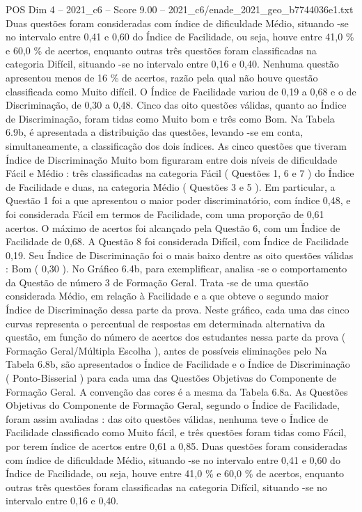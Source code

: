\begin{textsample}{POS Dim 4 – 2021\_c6 – Score 9.00 – 2021\_c6/enade\_2021\_geo\_b7744036e1.txt}
Duas questões foram consideradas com índice de dificuldade Médio, situando -se no intervalo entre 0,41 e 0,60 do Índice de Facilidade, ou seja, houve entre 41,0 \% e 60,0 \% de acertos, enquanto outras três questões foram classificadas na categoria Difícil, situando -se no intervalo entre 0,16 e 0,40.
Nenhuma questão apresentou menos de 16 \% de acertos, razão pela qual não houve questão classificada como Muito difícil.
O Índice de Facilidade variou de 0,19 a 0,68 e o de Discriminação, de 0,30 a 0,48.
Cinco das oito questões válidas, quanto ao Índice de Discriminação, foram tidas como Muito bom e três como Bom.
Na Tabela 6.9b, é apresentada a distribuição das questões, levando -se em conta, simultaneamente, a classificação dos dois índices.
As cinco questões que tiveram Índice de Discriminação Muito bom figuraram entre dois níveis de dificuldade Fácil e Médio : três classificadas na categoria Fácil ( Questões 1, 6 e 7 ) do Índice de Facilidade e duas, na categoria Médio ( Questões 3 e 5 ).
Em particular, a Questão 1 foi a que apresentou o maior poder discriminatório, com índice 0,48, e foi considerada Fácil em termos de Facilidade, com uma proporção de 0,61 acertos.
O máximo de acertos foi alcançado pela Questão 6, com um Índice de Facilidade de 0,68.
A Questão 8 foi considerada Difícil, com Índice de Facilidade 0,19.
Seu Índice de Discriminação foi o mais baixo dentre as oito questões válidas : Bom ( 0,30 ).
No Gráfico 6.4b, para exemplificar, analisa -se o comportamento da Questão de número 3 de Formação Geral.
Trata -se de uma questão considerada Médio, em relação à Facilidade e a que obteve o segundo maior Índice de Discriminação dessa parte da prova.
Neste gráfico, cada uma das cinco curvas representa o percentual de respostas em determinada alternativa da questão, em função do número de acertos dos estudantes nessa parte da prova ( Formação Geral/Múltipla Escolha ), antes de possíveis eliminações pelo Na Tabela 6.8b, são apresentados o Índice de Facilidade e o Índice de Discriminação ( Ponto-Bisserial ) para cada uma das Questões Objetivas do Componente de Formação Geral.
A convenção das cores é a mesma da Tabela 6.8a.
As Questões Objetivas do Componente de Formação Geral, segundo o Índice de Facilidade, foram assim avaliadas : das oito questões válidas, nenhuma teve o Índice de Facilidade classificado como Muito fácil, e três questões foram tidas como Fácil, por terem índice de acertos entre 0,61 a 0,85.
Duas questões foram consideradas com índice de dificuldade Médio, situando -se no intervalo entre 0,41 e 0,60 do Índice de Facilidade, ou seja, houve entre 41,0 \% e 60,0 \% de acertos, enquanto outras três questões foram classificadas na categoria Difícil, situando -se no intervalo entre 0,16 e 0,40.

\end{textsample}
